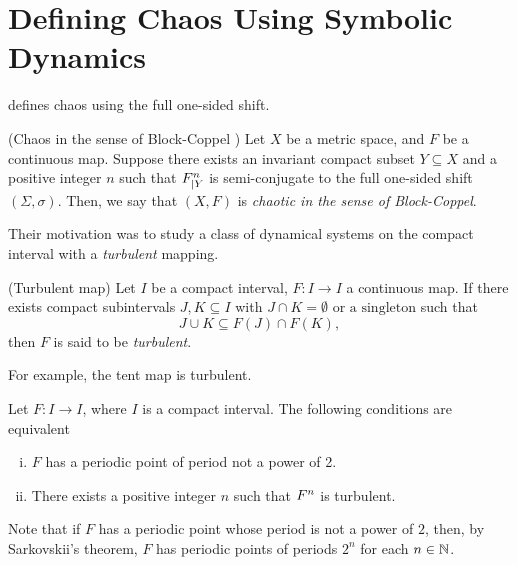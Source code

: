\documentclass[10pt,twoside]{book}
\begin{document}
\section{Defining Chaos Using Symbolic Dynamics}
\citet{blockcoppel} defines chaos using the full one-sided shift.
\begin{definition}
  (Chaos in the sense of Block-Coppel \citep{blockcoppel})
  Let $X$ be a metric space, and $F$ be a continuous map.
  Suppose there exists an invariant compact subset $Y \subseteq X$ and a positive integer $n$ such that $F^{n}_{|Y}$ is semi-conjugate to the full one-sided shift $(\Sigma, \sigma)$.
  Then, we say that $(X,F)$ is \textit{chaotic in the sense of Block-Coppel}.
  \begin{center}
  \end{center}
  \label{defn:blockcoppel}
\end{definition}
Their motivation was to study a class of dynamical systems on the compact interval with a \textit{turbulent} mapping.
\begin{definition}
  (Turbulent map)
  Let $I$ be a compact interval, $F: I \to I$ a continuous map.
  If there exists compact subintervals $J,K \subseteq I$ with $J \cap K = \emptyset \mbox{ or a singleton}$ such that
  \begin{equation*}
    J \cup K \subseteq F(J) \cap F(K),
  \end{equation*}
  then $F$ is said to be \textit{turbulent}.
\end{definition}
For example, the tent map is turbulent.
\begin{theorem}
  \citep[Chap.II]{blockcoppel}
  Let $F: I \to I$, where $I$ is a compact interval.
  The following conditions are equivalent
  \begin{enumerate}[(i)]
    \item $F$ has a periodic point of period not a power of 2.
    \item There exists a positive integer $n$ such that $F^{n}$ is turbulent.
  \end{enumerate}
  \label{thm:blcpII}
\end{theorem}
Note that if $F$ has a periodic point whose period is not a power of $2$, then, by Sarkovskii's theorem, $F$ has periodic points of periods $2^n$ for each $n \in \mathbb{N}$.




\printindex
\end{document}

